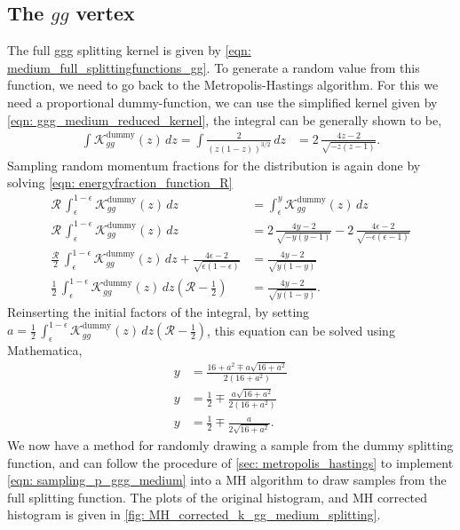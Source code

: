 \documentclass[main.tex]{subfiles}
\begin{document}
\subsection*{The \(gg\) vertex}
The full ggg splitting kernel is given by \autoref{eqn: medium_full_splittingfunctions_gg}.
To generate a random value from this function, we need to go back to the Metropolis-Hastings algorithm. 
For this we need a proportional dummy-function, we can use the simplified kernel given by \autoref{eqn: ggg_medium_reduced_kernel}, the integral can be generally shown to be, 
\begin{align}
    \int \mathcal{K}_{gg}^{\text{dummy}}(z)\,dz = \int \frac{2}{(z(1-z))^{3/2}}\,dz &= 2\,\frac{4z-2}{\sqrt{-z(z-1)}}.
\end{align}
Sampling random momentum fractions for the distribution is again done by solving \autoref{eqn: energyfraction_function_R}
\begin{align}
    \mathcal{R}\, \int_{\epsilon}^{1-\epsilon} \mathcal{K}_{gg}^{\text{dummy}}(z)\,dz &= \int_{\epsilon}^{y} \mathcal{K}_{gg}^{\text{dummy}}(z)\,dz \nonumber \\
    \mathcal{R}\, \int_{\epsilon}^{1-\epsilon} \mathcal{K}_{gg}^{\text{dummy}}(z)\,dz &= 2\,\frac{4y-2}{\sqrt{-y(y-1)}} - 2\,\frac{4\epsilon-2}{\sqrt{-\epsilon(\epsilon-1)}} \nonumber\\
    \frac{\mathcal{R}}{2}\, \int_{\epsilon}^{1-\epsilon} \mathcal{K}_{gg}^{\text{dummy}}(z)\,dz + \frac{4\epsilon-2}{\sqrt{\epsilon(1-\epsilon)}} &= \frac{4y-2}{\sqrt{y(1-y)}} \nonumber\\
    \frac{1}{2}\, \int_{\epsilon}^{1-\epsilon} \mathcal{K}_{gg}^{\text{dummy}}(z)\,dz \left(\mathcal{R}-\frac{1}{2} \right) &= \frac{4y-2}{\sqrt{y(1-y)}}.
\end{align}
Reinserting the initial factors of the integral, by setting \( a= \frac{1}{2}\, \int_{\epsilon}^{1-\epsilon} \mathcal{K}_{gg}^{\text{dummy}}(z)\,dz \left(\mathcal{R}-\frac{1}{2} \right)\), this equation can be solved using Mathematica,
\begin{align}\label{eqn: sampling_p_ggg_medium}
    y &= \frac{16 + a^2 \mp a \sqrt{16 + a^2}}{2 (16 + a^2)} \nonumber\\
    y &= \frac{1}{2} \mp \frac{a \sqrt{16 + a^2}}{2 (16 + a^2)} \nonumber\\
    y &= \frac{1}{2} \mp \frac{a }{2 \sqrt{16 + a^2}}.
\end{align}
We now have a method for randomly drawing a sample from the dummy splitting function, and can follow the procedure of \autoref{sec: metropolis_hastings} to implement \autoref{eqn: sampling_p_ggg_medium} into a MH algorithm to draw samples from the full splitting function. The plots of the original histogram, and MH corrected histogram is given in \autoref{fig: MH_corrected_k_gg_medium_splitting}.
\end{document}
